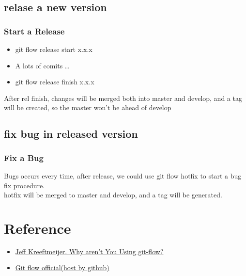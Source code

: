 \documentclass{beamer}
\begin{document}
\subsection{relase a new version}
\begin{frame}
	\frametitle{Start a Release}
	\begin{itemize}
		\item git flow release start x.x.x
		\item A lots of comits \ldots
		\item git flow release finish x.x.x
	\end{itemize}
	After rel finish, changes will be merged both into master and develop, and a tag will be created, so the master won't be ahead of develop
\end{frame}
\subsection{fix bug in released version}
\begin{frame}
	\frametitle{Fix a Bug}
	Bugs occurs every time, after release, we could use git flow hotfix to start a bug fix procedure. \\
	hotfix will be merged to master and develop, and a tag will be generated.

\end{frame}

\section{Reference}
\begin{frame}
	\begin{itemize}
		\item \href{http://jeffkreeftmeijer.com/2010/why-arent-you-using-git-flow/}{Jeff Kreeftmeijer. Why aren't You Using git-flow?}
		\item \href{https://github.com/nvie/gitflow}{Git flow official(host by github)}
	\end{itemize}
\end{frame}
\end{document}
